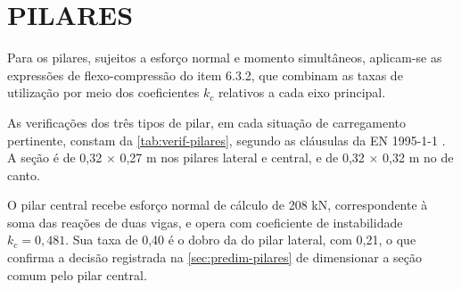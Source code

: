 \section{PILARES}\label{sec:verif-pilares}

Para os pilares, sujeitos a esforço normal e momento simultâneos, aplicam-se as
expressões de flexo-compressão do item 6.3.2, que combinam as taxas de
utilização por meio dos coeficientes $k_c$ relativos a cada eixo principal.

As verificações dos três tipos de pilar, em cada situação de carregamento
pertinente, constam da \autoref{tab:verif-pilares}, segundo as cláusulas da
EN 1995-1-1 \cite{EN1995-1-1:2004}. A seção é de 0,32 $\times$ 0,27 m nos pilares
lateral e central, e de 0,32 $\times$ 0,32 m no de canto.


O pilar central recebe esforço normal de cálculo de 208 kN, correspondente à
soma das reações de duas vigas, e opera com coeficiente de instabilidade
$k_c = 0{,}481$. Sua taxa de 0,40 é o dobro da do pilar lateral, com 0,21,
o que confirma a decisão registrada na \autoref{sec:predim-pilares} de dimensionar
a seção comum pelo pilar central.

